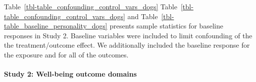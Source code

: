 \documentclass[
  singlecolumn,
  9pt]{article}
\let\oldparagraph\paragraph
\renewcommand{\paragraph}[1]{\oldparagraph{#1}\mbox{}}
\begin{document}
\begin{table}

\caption{\label{tbl-table\_baseline\_personality\_dogs}Personality
variables measured at baseline}


\end{table}%

Table~\ref{tbl-table_confounding_control_vars_dogs}
Table~\ref{tbl-table_confounding_control_vars_dogs} and
Table~\ref{tbl-table_baseline_personality_dogs} presents sample
statistics for baseline responses in Study 2. Baseline variables were
included to limit confounding of the the treatment/outcome effect. We
additionally included the baseline response for the exposure and for all
of the outcomes.

\paragraph{Study 2: Well-being outcome
domains}\label{study-2-well-being-outcome-domains}
\end{document}
